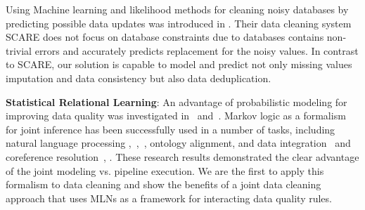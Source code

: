 Using Machine learning and likelihood methods for cleaning noisy databases by predicting possible data updates was introduced in \cite{Yakout:2013:DSU:2463676.2463706}. Their data cleaning system \textsc{SCARE} does not focus on database constraints due to databases contains non-trivial errors and accurately predicts replacement for the noisy values. In contrast to \textsc{SCARE}, our solution is capable to model and predict not only missing values imputation and data consistency but also data deduplication. 

\textbf{Statistical Relational Learning}: An advantage of probabilistic modeling for improving data quality was investigated in~\cite{doi:10.1080/01621459.1972.10481323} and~\cite{chen2011usher}. Markov logic as a formalism for joint inference has been successfully used in a number of tasks, including natural language processing \cite{che2010jointly},~\cite{riedel08collective},~\cite{meza09jointly}, ontology alignment, and data integration~\cite{niepert2011probabilistic} and coreference resolution~\cite{poon2008joint}, \cite{singla2006entity}. These research results demonstrated the clear advantage of the joint modeling vs. pipeline execution. We are the first to apply this formalism to data cleaning and show the benefits of a joint data cleaning approach that uses MLNs as a framework for interacting data quality rules. 

